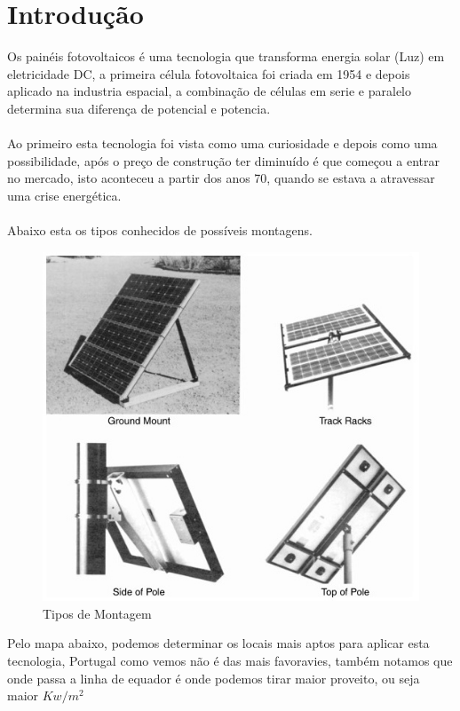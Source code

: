 \section{Introdução}
\qquad Os painéis fotovoltaicos é uma tecnologia que transforma energia solar (Luz) em eletricidade DC, a primeira célula fotovoltaica foi criada em 1954 e depois aplicado na industria espacial, a combinação de células em serie e paralelo determina sua diferença de potencial e potencia.\cite{article_1}\\
\\
Ao primeiro esta tecnologia foi vista como uma curiosidade e depois como uma possibilidade, após o preço de construção ter diminuído é que começou a entrar no mercado, isto aconteceu a partir dos anos 70, quando se estava a atravessar uma crise energética.\cite{article_1}\\
\\
Abaixo esta os tipos conhecidos de possíveis montagens.\\
\begin{figure}[H]
\centering
\includegraphics[scale=0.6]{./image/Mount_Method.jpg}
\caption{Tipos de Montagem \cite{book_2}}
\end{figure}
Pelo mapa abaixo, podemos determinar os locais mais aptos para aplicar esta tecnologia, Portugal como vemos não é das mais favoravies, também notamos que onde passa a linha de equador é onde podemos tirar maior proveito, ou seja maior {\bf $Kw/m^2$}
